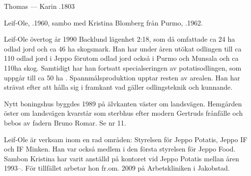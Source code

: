 Thomas   ---  Karin .1803



%



%
Leif-Ole, .1960, sambo med Kristina Blomberg från Purmo, .1962.
\begin{jhchildren}
  \item {}
  \item {}
\end{jhchildren}
Leif-Ole övertog år 1990 Backlund lägenhet 2:18, som då omfattade ca 24 ha odlad jord och ca 46 ha skogsmark. Han har under åren utökat odlingen till ca 110 odlad jord i Jeppo förutom odlad jord också i Purmo och Munsala och ca 110ha skog. Samtidigt har han fortsatt specialseringen av potatisodlingen, som uppgår till ca 50 ha . Spannmålsproduktion upptar resten av arealen. Han har strävat efter att hålla sig i framkant vad gäller odlingsteknik och kunnande.

Nytt boningshus byggdes 1989 på älvkanten väster om landsvägen. Hemgården öster om landsvägen kvarstår som sterbhus efter modern Gertruds frånfälle och bebos av fadern Bruno Romar. Se nr 11.

Leif-Ole är verksam inom en rad områden: Styrelsen för Jeppo Potatis, Jeppo IF och IF Minken. Han var också medlem i den första styrelsen för Jeppo Food. Sambon Kristina har varit anställd på kontoret vid Jeppo Potatis mellan åren 1993--. För tillfället arbetar hon fr.om. 2009 på Arbetskliniken i Jakobstad.



%



